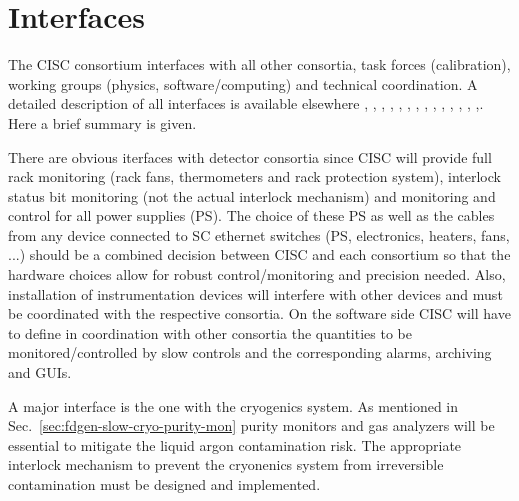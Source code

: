 \section{Interfaces}
\label{sec:fdgen-slow-cryo-intfc}


The CISC consortium interfaces with all other consortia, task forces (calibration), working groups (physics, software/computing) and technical coordination.  
A detailed description of all interfaces is available elsewhere
 \cite{bib:docdb7018}
,\cite{bib:docdb6745}
,\cite{bib:docdb6991}
,\cite{bib:docdb6790}
,\cite{bib:docdb6787}
,\cite{bib:docdb6784}
,\cite{bib:docdb6781}
,\cite{bib:docdb6760}
,\cite{bib:docdb6679}
,\cite{bib:docdb6730}
,\cite{bib:docdb7126}
,\cite{bib:docdb7099}
,\cite{bib:docdb7072}
,\cite{bib:docdb7045}
,\cite{bib:docdb7018}. Here a brief summary is given. 

There are obvious iterfaces with detector consortia since CISC will provide full rack monitoring (rack fans, thermometers and rack protection system),
interlock status bit monitoring (not the actual interlock mechanism) and monitoring and control for all power supplies (PS). The choice of these   
PS as well as the cables from any device connected to SC ethernet switches (PS, electronics, heaters, fans, ...)
should be a combined decision between CISC and each consortium so that the hardware choices allow for robust control/monitoring and precision needed.  
Also, installation of instrumentation devices will interfere with other devices and must be coordinated with the respective consortia.  
On the software side CISC will have to define in coordination with other consortia the quantities to be monitored/controlled by slow controls and the corresponding alarms,
archiving and GUIs. 



A major interface is the one with the cryogenics system. As mentioned in Sec.~\ref{sec:fdgen-slow-cryo-purity-mon} purity monitors and gas analyzers will be essential
to mitigate the liquid argon contamination risk. The appropriate interlock mechanism to prevent the cryonenics system from irreversible contamination
must be designed and implemented. 

